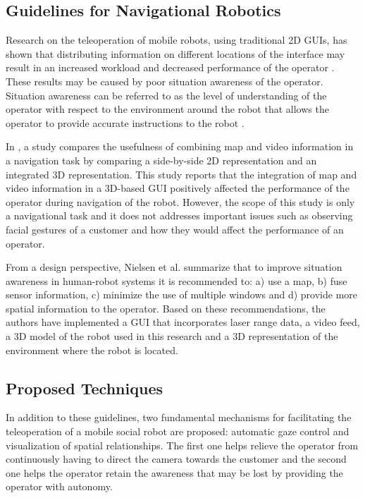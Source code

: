 \documentclass[a4paper, 10pt, conference]{ieeeconf}     %
\begin{document}
\subsection{Guidelines for Navigational Robotics}
Research on the teleoperation of mobile robots, using traditional 2D GUIs, has shown that distributing information on different locations of the interface may result in an increased workload and decreased performance of the operator \cite{nielsen:ecological}.
These results may be caused by poor situation awareness of the operator.
Situation awareness can be referred to as the level of understanding of the operator with respect to the environment around the robot that allows the operator to provide accurate instructions to the robot \cite{nofi:defining}.

In \cite{nielsen:comparing}, a study compares the usefulness of combining map and video information in a navigation task by comparing a side-by-side 2D representation and an integrated 3D representation. 
This study reports that the integration of map and video information in a 3D-based GUI positively affected the performance of the operator during navigation of the robot.
However, the scope of this study is only a navigational task and it does not addresses important issues such as observing facial gestures of a customer and how they would affect the performance of an operator. 
 
From a design perspective, Nielsen et al. \cite{nielsen:ecological} summarize that to improve situation awareness in human-robot systems it is recommended to: a) use a map, b) fuse sensor information, c) minimize the use of multiple windows and d) provide more spatial information to the operator. 
Based on these recommendations, the authors have implemented a GUI that incorporates laser range data, a video feed, a 3D model of the robot used in this research and a 3D representation of the environment where the robot is located.

\subsection{Proposed Techniques}
\label{subsec:proposed}
In addition to these guidelines, two fundamental mechanisms for facilitating the teleoperation of a mobile social robot are proposed: automatic gaze control and visualization of spatial relationships.
The first one helps relieve the operator from continuously having to direct the camera towards the customer and the second one helps the operator retain the awareness that may be lost by providing the operator with autonomy.
\end{document}
